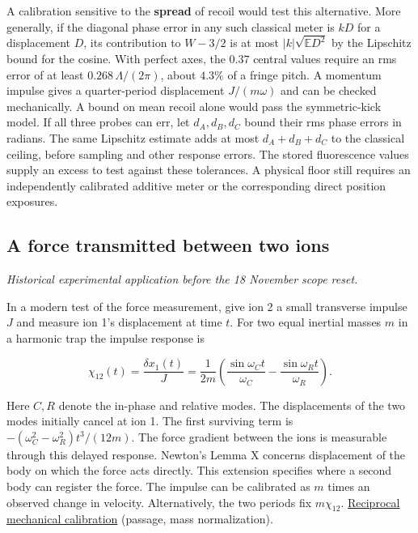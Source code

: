 \documentclass[11pt,a4paper]{article}
\begin{document}
A calibration sensitive to the \textbf{spread} of recoil would test this
alternative. More generally, if the diagonal phase error in any such
classical meter is \(kD\) for a displacement \(D\), its contribution to
\(W-3/2\) is at most \(|k|\sqrt{\mathbb E D^2}\) by the Lipschitz bound
for the cosine. With perfect axes, the \(0.37\) central values require
an rms error of at least \(0.268\,\Lambda/(2\pi)\), about \(4.3\%\) of a
fringe pitch. A momentum impulse gives a quarter-period displacement
\(J/(m\omega)\) and can be checked mechanically. A bound on mean recoil
alone would pass the symmetric-kick model. If all three probes can err,
let \(d_A,d_B,d_C\) bound their rms phase errors in radians. The same
Lipschitz estimate adds at most \(d_A+d_B+d_C\) to the classical
ceiling, before sampling and other response errors. The stored
fluorescence values supply an excess to test against these tolerances. A
physical floor still requires an independently calibrated additive meter
or the corresponding direct position exposures.

\subsection{A force transmitted between two
ions}\label{a-force-transmitted-between-two-ions}

\emph{Historical experimental application before the 18 November scope
reset.}

In a modern test of the force measurement, give ion 2 a small transverse
impulse \(J\) and measure ion 1's displacement at time \(t\). For two
equal inertial masses \(m\) in a harmonic trap the impulse response is

\[
\chi_{12}(t)=\frac{\delta x_1(t)}{J}
=\frac{1}{2m}\left(\frac{\sin\omega_C t}{\omega_C}
                    -\frac{\sin\omega_R t}{\omega_R}\right).
\]

Here \(C,R\) denote the in-phase and relative modes. The displacements
of the two modes initially cancel at ion 1. The first surviving term is
\(-(\omega_C^2-\omega_R^2)t^3/(12m)\). The force gradient between the
ions is measurable through this delayed response. Newton's Lemma X
concerns displacement of the body on which the force acts directly. This
extension specifies where a second body can register the force. The
impulse can be calibrated as \(m\) times an observed change in velocity.
Alternatively, the two periods fix \(m\chi_{12}\).
\href{rotation-composition-universality.md\#reciprocal-mechanical-calibration}{Reciprocal
mechanical calibration} (passage, mass normalization).
\end{document}
